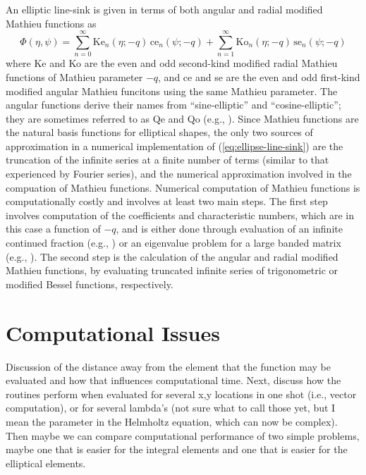 \documentclass{elsart}
\begin{document}
An elliptic line-sink is given in terms of both angular and radial modified Mathieu functions as
\begin{equation}
  \label{eq:ellipse-line-sink}
  \Phi(\eta,\psi) = \sum_{n=0}^{\infty} \text{Ke}_{n}(\eta;-q) \, \text{ce}_{n}(\psi;-q) + \sum_{n=1}^{\infty} \text{Ko}_{n}(\eta;-q) \, \text{se}_{n}(\psi;-q)
\end{equation}
where Ke and Ko are the even and odd second-kind modified radial Mathieu functions of Mathieu parameter $-q$, and ce and se are the even and odd first-kind modified angular Mathieu funcitons using the same Mathieu parameter.  The angular functions derive their names from ``sine-elliptic'' and ``cosine-elliptic''; they are sometimes referred to as Qe and Qo (e.g., \cite{alhargan2000}).  Since Mathieu functions are the natural basis functions for elliptical shapes, the only two sources of approximation in a numerical implementation of (\ref{eq:ellipse-line-sink}) are the truncation of the infinite series at a finite number of terms (similar to that experienced by Fourier series), and the numerical approximation involved in the compuation of Mathieu functions.  Numerical computation of Mathieu functions is computationally costly and involves at least two main steps.  The first step involves computation of the coefficients and characteristic numbers, which are in this case a function of $-q$, and is either done through evaluation of an infinite continued fraction (e.g., \cite{blanch1966numerical,alhargan2000}) or an eigenvalue problem for a large banded matrix (e.g., \cite{stamnes1995new,chaos2002mathieu}). The second step is the calculation of the angular and radial modified Mathieu functions, by evaluating truncated infinite series of trigonometric or modified Bessel functions, respectively.

\section{Computational Issues}
Discussion of the distance away from the element that the function may be evaluated and how that influences computational time. Next, discuss how the routines perform when evaluated for several x,y locations in one shot (i.e., vector computation), or for several lambda's (not sure what to call those yet, but I mean the parameter in the Helmholtz equation, which can now be complex).  Then maybe we can compare computational performance of two simple problems, maybe one that is easier for the integral elements and one that is easier for the elliptical elements.
\end{document}
